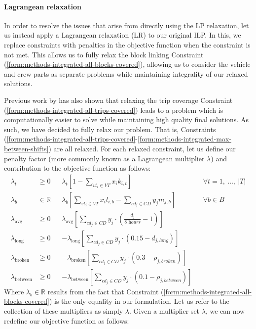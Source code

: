 \documentclass[]{article}
\begin{document}
\paragraph{Lagrangean relaxation} \label{sec:lagrangean-relaxation}
In order to resolve the issues that arise from directly using the LP relaxation, let us instead apply a Lagrangean relaxation (LR) to our original ILP. In this, we replace constraints with penalties in the objective function when the constraint is not met. This allows us to fully relax the block linking Constraint (\ref{form:methods-integrated-all-blocks-covered}), allowing us to consider the vehicle and crew parts as separate problems while maintaining integrality of our relaxed solutions. 

Previous work by \citet{vanKootenNiekerk2017} has also shown that relaxing the trip coverage Constraint (\ref{form:methods-integrated-all-trips-covered}) leads to a problem which is computationally easier to solve while maintaining high quality final solutions. As such, we have decided to fully relax our problem. That is, Constraints (\ref{form:methods-integrated-all-trips-covered}-\ref{form:methods-integrated-max-between-shifts}) are all relaxed. For each relaxed constraint, let us define our penalty factor (more commonly known as a Lagrangean multiplier $\lambda$) and contribution to the objective function as follows: 
\begin{align}
\lambda_{t} &\geq 0 && \lambda_{t} [1 - \sum_{vt_i \in VT} x_{i}k_{i,t}] && \forall t = 1,\:\dots,\:|T| \nonumber \\
\lambda_{b} &\in \mathbb{R} && \lambda_{b} [\sum_{vt_i \in VT} x_i l_{i,b} - \sum_{cd_j \in CD}y_j m_{j,b}] && \forall b \in B \nonumber \\
\lambda_{\text{avg}} &\geq 0 && \lambda_{\text{avg}} [\sum_{cd_j \in \textit{CD}} y_{j} \cdot (\frac{d_{j}}{\textit{8 hours}} - 1)] && \nonumber \\
\lambda_{\text{long}} &\geq 0 && -\lambda_{\text{long}} [\sum_{cd_j \in \textit{CD}} y_{j} \cdot (0.15 - d_{j,\textit{long}})] && \nonumber \\
\lambda_{\text{broken}} &\geq 0 && -\lambda_{\text{broken}} [\sum_{cd_j \in \textit{CD}} y_{j} \cdot (0.3 - \rho_{j,\textit{broken}})] && \nonumber \\
\lambda_{\text{between}} &\geq 0 && -\lambda_{\text{between}} [\sum_{cd_j \in \textit{CD}} y_{j} \cdot (0.1 - \rho_{j,\textit{between}})] && \nonumber
\end{align}
Where $\lambda_b \in \mathbb{R}$ results from the fact that Constraint (\ref{form:methods-integrated-all-blocks-covered}) is the only equality in our formulation. Let us refer to the collection of these multipliers as simply $\lambda$. Given a multiplier set $\lambda$, we can now redefine our objective function as follows:
\end{document}
